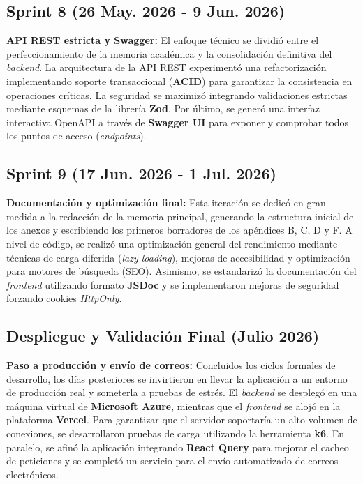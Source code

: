 \subsection{Sprint 8 (26 May. 2026 - 9 Jun. 2026)}
\textbf{API REST estricta y Swagger:} El enfoque técnico se dividió entre el perfeccionamiento de la memoria académica y la consolidación definitiva del \textit{backend}. La arquitectura de la API REST experimentó una refactorización implementando soporte transaccional (\textbf{ACID}) para garantizar la consistencia en operaciones críticas. La seguridad se maximizó integrando validaciones estrictas mediante esquemas de la librería \textbf{Zod}. Por último, se generó una interfaz interactiva OpenAPI a través de \textbf{Swagger UI} para exponer y comprobar todos los puntos de acceso (\textit{endpoints}).

\subsection{Sprint 9 (17 Jun. 2026 - 1 Jul. 2026)}
\textbf{Documentación y optimización final:} Esta iteración se dedicó en gran medida a la redacción de la memoria principal, generando la estructura inicial de los anexos y escribiendo los primeros borradores de los apéndices B, C, D y F. A nivel de código, se realizó una optimización general del rendimiento mediante técnicas de carga diferida (\textit{lazy loading}), mejoras de accesibilidad y optimización para motores de búsqueda (SEO). Asimismo, se estandarizó la documentación del \textit{frontend} utilizando formato \textbf{JSDoc} y se implementaron mejoras de seguridad forzando cookies \textit{HttpOnly}.

\subsection*{Despliegue y Validación Final (Julio 2026)}
\textbf{Paso a producción y envío de correos:} Concluidos los ciclos formales de desarrollo, los días posteriores se invirtieron en llevar la aplicación a un entorno de producción real y someterla a pruebas de estrés. El \textit{backend} se desplegó en una máquina virtual de \textbf{Microsoft Azure}, mientras que el \textit{frontend} se alojó en la plataforma \textbf{Vercel}. Para garantizar que el servidor soportaría un alto volumen de conexiones, se desarrollaron pruebas de carga utilizando la herramienta \textbf{k6}. En paralelo, se afinó la aplicación integrando \textbf{React Query} para mejorar el cacheo de peticiones y se completó un servicio para el envío automatizado de correos electrónicos.

